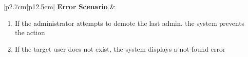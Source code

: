 \begin{table}[H]
\begin{tabular}{|p{2.7cm}|p{12.5cm}|}
        \hline
        \textbf{Error Scenario} & \begin{minipage}[t]{\linewidth}
                                      \begin{enumerate}[topsep=0pt,itemsep=1pt,parsep=0pt,partopsep=0pt]
                                          \item If the administrator attempts to demote the last admin, the system prevents the
                                                action
                                          \item If the target user does not exist, the system displays a not-found error
                                      \end{enumerate}
                                  \end{minipage}  \\
        \hline
    \end{tabular}
    \label{tab:admin-users}
\end{table}
